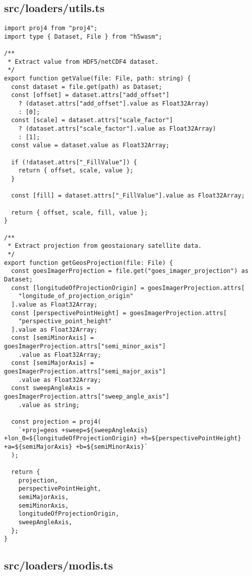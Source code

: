 \subsection{src/loaders/utils.ts}
\begin{verbatim}
import proj4 from "proj4";
import type { Dataset, File } from "h5wasm";

/**
 * Extract value from HDF5/netCDF4 dataset.
 */
export function getValue(file: File, path: string) {
  const dataset = file.get(path) as Dataset;
  const [offset] = dataset.attrs["add_offset"]
    ? (dataset.attrs["add_offset"].value as Float32Array)
    : [0];
  const [scale] = dataset.attrs["scale_factor"]
    ? (dataset.attrs["scale_factor"].value as Float32Array)
    : [1];
  const value = dataset.value as Float32Array;

  if (!dataset.attrs["_FillValue"]) {
    return { offset, scale, value };
  }

  const [fill] = dataset.attrs["_FillValue"].value as Float32Array;

  return { offset, scale, fill, value };
}

/**
 * Extract projection from geostaionary satellite data.
 */
export function getGeosProjection(file: File) {
  const goesImagerProjection = file.get("goes_imager_projection") as Dataset;
  const [longitudeOfProjectionOrigin] = goesImagerProjection.attrs[
    "longitude_of_projection_origin"
  ].value as Float32Array;
  const [perspectivePointHeight] = goesImagerProjection.attrs[
    "perspective_point_height"
  ].value as Float32Array;
  const [semiMinorAxis] = goesImagerProjection.attrs["semi_minor_axis"]
    .value as Float32Array;
  const [semiMajorAxis] = goesImagerProjection.attrs["semi_major_axis"]
    .value as Float32Array;
  const sweepAngleAxis = goesImagerProjection.attrs["sweep_angle_axis"]
    .value as string;

  const projection = proj4(
    `+proj=geos +sweep=${sweepAngleAxis} +lon_0=${longitudeOfProjectionOrigin} +h=${perspectivePointHeight} +a=${semiMajorAxis} +b=${semiMinorAxis}`
  );

  return {
    projection,
    perspectivePointHeight,
    semiMajorAxis,
    semiMinorAxis,
    longitudeOfProjectionOrigin,
    sweepAngleAxis,
  };
}

\end{verbatim}
\subsection{src/loaders/modis.ts}
\begin{verbatim}

\end{verbatim}
